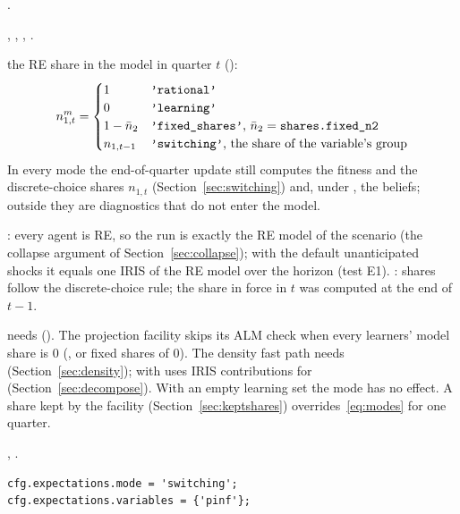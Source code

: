 \documentclass[11pt,a4paper]{article}
\DeclareRobustCommand{\codem}[1]{\texttt{\detokenize{#1}}}
\newenvironment{optspec}%
  {\begin{description}[style=sameline,leftmargin=2.7cm,labelwidth=2.5cm,font=\normalfont\itshape]}%
  {\end{description}}
\begin{document}
\subsubsection{\texorpdfstring{\codem{expectations.mode}}{expectations.mode}}\label{opt:expectations-mode}
\begin{optspec}
  \item[Default] .
  \item[Values] , , , .
  \item[Math] the RE share in the model in quarter $t$ ():
\begin{equation}\label{eq:modes}
  n^m_{1,t} =
  \begin{cases}
    1 & \text{\codem{'rational'}}\\
    0 & \text{\codem{'learning'}}\\
    1 - \bar n_2 & \text{\codem{'fixed_shares'}, } \bar n_2 = \text{\codem{shares.fixed_n2}}\\
    n_{1,t-1} & \text{\codem{'switching'}, the share of the variable's group}
  \end{cases}
\end{equation}
        In every mode the end-of-quarter update still computes the fitness and the
        discrete-choice shares $n_{1,t}$ (Section~\ref{sec:switching}) and, under
        , the beliefs; outside  they are
        diagnostics that do not enter the model.
  \item[Assumptions] : every agent is RE, so the run is exactly the RE model
        of the scenario (the collapse argument of Section~\ref{sec:collapse}); with the default
        unanticipated shocks it equals one IRIS  of the RE model over the
        horizon (test  E1). : shares follow the
        discrete-choice rule; the share in force in $t$ was computed at the end of $t-1$.
  \item[Interactions]  needs 
        (). The projection facility skips its ALM check when
        every learners' model share is 0 (, or fixed shares of 0). The density
        fast path needs  (Section~\ref{sec:density}); 
        with  uses IRIS contributions for 
        (Section~\ref{sec:decompose}). With an empty learning set the mode has no effect. A
        share kept by the facility (Section~\ref{sec:keptshares}) overrides~\eqref{eq:modes}
        for one quarter.
  \item[Code] , .
  \item[Example]
\begin{lstlisting}
cfg.expectations.mode = 'switching';
cfg.expectations.variables = {'pinf'};
\end{lstlisting}
\end{optspec}
\end{document}
